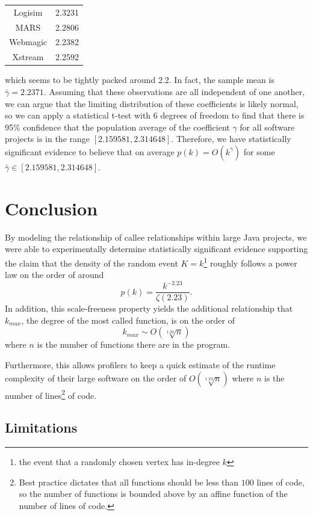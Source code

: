 \documentclass[11pt,a4paper,twocolumn]{article}
\begin{document}
\begin{singlespace}
\begin{table}[H]
\begin{tabular}{|c|c|}
Logisim \cite{Logisim} & 2.3231 \\
MARS \cite{MARS} & 2.2806 \\
Webmagic \cite{WebMagic} & 2.2382 \\
Xstream \cite{Xstream} & 2.2592 \\ \hline
\end{tabular}
\end{table}
\noindent which seems to be tightly packed around $2.2$. In fact, the sample mean is
$\bar \gamma = 2.2371$. Assuming that these observations are all independent
of one another, we can argue that the limiting distribution of these coefficients
is likely normal, so we can apply a statistical t-test with 6 degrees of freedom to find
that there is 95\% confidence that the population average of the coefficient $\gamma$
for all software projects is in the range $[2.159581, 2.314648]$. Therefore, we have
 statistically significant evidence to believe that on average
 $p(k) = O(k^{\bar \gamma})$ for some $\bar \gamma \in [2.159581, 2.314648]$.
\section{Conclusion}
By modeling the relationship of callee relationships within large Java projects, we were
able to experimentally determine statistically significant evidence supporting
the claim that the density of the random event $K = k$\footnote{the event that a randomly
chosen vertex has in-degree $k$} roughly follows a power law on the order of around
$$p(k) = \frac{k^{-2.23}}{\zeta(2.23)}.$$ In addition, this scale-freeness property yields
the additional relationship that $k_{max}$, the degree of the most called function, is on the order of
$$k_{max} \sim O(\sqrt[1.23]{n})$$ where $n$ is the number of functions there are in the program.

Furthermore, this allows profilers to keep a quick estimate of the runtime complexity
of their large software on the order of $O(\sqrt[1.23]{n})$ where $n$ is the number of
lines\footnote{Best practice dictates that all functions should be less than $100$ lines
of code, so the number of functions is bounded above by an affine function of
the number of lines of code.} of code.
\subsection*{Limitations}


\end{singlespace}
\end{document}
